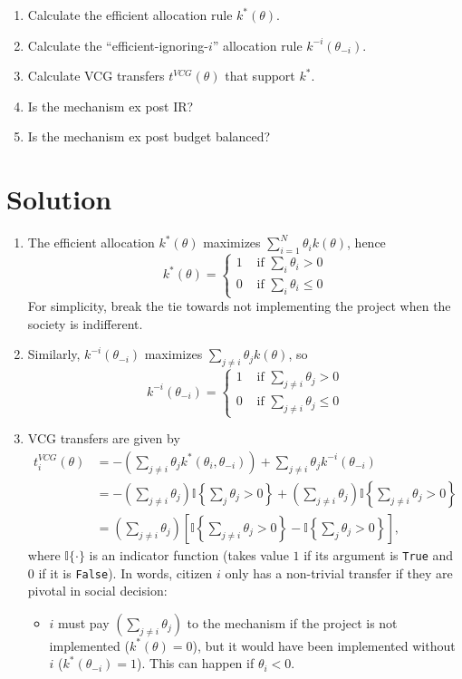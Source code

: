 \documentclass[a4paper]{article}
\newif\ifsolutions
\begin{document}
	\begin{enumerate}
		\item Calculate the efficient allocation rule $k^*(\theta)$.
		\item Calculate the ``efficient-ignoring-$i$'' allocation rule $k^{-i}(\theta_{-i})$.
		\item Calculate VCG transfers $t^{VCG}(\theta)$ that support $k^*$.
		\item Is the mechanism ex post IR?
		\item Is the mechanism ex post budget balanced?
	\end{enumerate}
	
\ifsolutions
\section*{Solution}
	\begin{enumerate}
		\item The efficient allocation $k^*(\theta)$ maximizes $\sum_{i=1}^N \theta_i k(\theta)$, hence 
		$$
			k^*(\theta) = 
			\begin{cases}
				1 & \text{ if } \sum_i \theta_i > 0
				\\
				0 & \text{ if } \sum_i \theta_i \leq 0
			\end{cases}
		$$
		For simplicity, break the tie towards not implementing the project when the society is indifferent.
		
		\item Similarly, $k^{-i}(\theta_{-i})$ maximizes $\sum_{j \neq i} \theta_j k(\theta)$, so 
		$$
		k^{-i}(\theta_{-i}) = 
		\begin{cases}
		1 & \text{ if } \sum_{j \neq i} \theta_j > 0
		\\
		0 & \text{ if } \sum_{j \neq i} \theta_j \leq 0
		\end{cases}
		$$
		
		\item VCG transfers are given by
		\begin{align*}
			t_{i}^{VCG}(\theta) &= -\left(\sum_{j\neq i} \theta_j k^*(\theta_i, \theta_{-i}) \right) + \sum_{j\neq i} \theta_j k^{-i}(\theta_{-i})
			\\
			&= -\left(\sum_{j\neq i} \theta_j \right) \mathbb{I}\left\{ \sum_j \theta_j > 0 \right\} +\left( \sum_{j\neq i} \theta_j \right) \mathbb{I}\left\{ \sum_{j \neq i} \theta_j > 0 \right\}
			\\
			&= \left(\sum_{j\neq i} \theta_j \right) \left[ \mathbb{I}\left\{ \sum_{j \neq i} \theta_j > 0 \right\} - \mathbb{I}\left\{ \sum_j \theta_j > 0 \right\} \right],
		\end{align*}
		where $\mathbb{I}\{\cdot\}$ is an indicator function (takes value $1$ if its argument is \texttt{True} and $0$ if it is \texttt{False}). In words, citizen $i$ only has a non-trivial transfer if they are pivotal in social decision:
		\begin{itemize}
			\item $i$ must pay $\left(\sum_{j\neq i} \theta_j \right)$ to the mechanism if the project is not implemented ($k^*(\theta)=0$), but it would have been implemented without $i$ ($k^*(\theta_{-i})=1$). This can happen if $\theta_i < 0$.
			

\end{itemize}
\end{enumerate}
\end{document}
